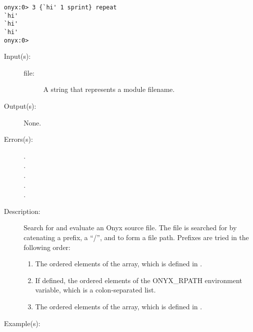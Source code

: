 \begin{description}
\begin{description}
\begin{verbatim}
onyx:0> 3 {`hi' 1 sprint} repeat
`hi'
`hi'
`hi'
onyx:0>
		\end{verbatim}
	\end{description}
\label{systemdict:require}
\item[{\onyxop{file}{require}{--}}: ]
	\begin{description}\item[]
	\item[Input(s): ]
		\begin{description}\item[]
		\item[file: ]
			A string that represents a module filename.
		\end{description}
	\item[Output(s): ] None.
	\item[Errors(s): ]
		\begin{description}\item[]
		\item[.]
		\item[.]
		\item[.]
		\item[.]
		\item[.]
		\end{description}
	\item[Description: ]
		Search for and evaluate an Onyx source file.  The file is
		searched for by catenating a prefix, a ``/'', and 
		to form a file path.  Prefixes are tried in the following order:
		\begin{enumerate}
			\item{The ordered elements of the
			 array, which is
			defined in .}
			\item{If defined, the ordered elements of the
			ONYX\_RPATH environment variable, which is a
			colon-separated list.}
			\item{The ordered elements of the
			 array, which
			is defined in .}
		\end{enumerate}
	\item[Example(s): ]\begin{verbatim}


\end{verbatim}
\end{description}
\end{description}
